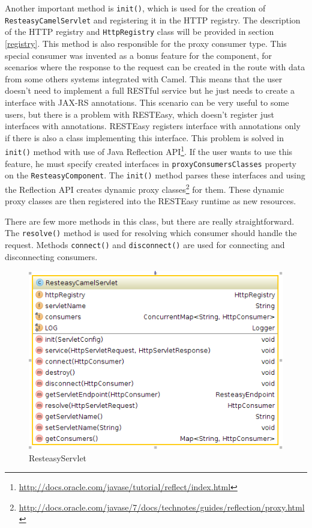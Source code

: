 \documentclass[12pt,final,oneside]{fithesis2}
\begin{document}
Another important method is \texttt{init()}, which is used for the creation of \texttt{ResteasyCamelServlet} and registering it in the HTTP registry. The description of the HTTP registry and \texttt{HttpRegistry} class will be provided in section \ref{registry}. This method is also responsible for the proxy consumer type. This special consumer was invented as a bonus feature for the component, for scenarios where the response to the request can be created in the route with data from some others systems integrated with Camel. This means that the user doesn't need to implement a full RESTful service but he just needs to create a interface with JAX-RS annotations. This scenario can be very useful to some users, but there is a problem with RESTEasy, which  doesn't register just interfaces with annotations. RESTEasy registers interface with annotations only if there is also a class implementing this interface. This problem is solved in \texttt{init()} method with use of Java Reflection API\footnote{\url{http://docs.oracle.com/javase/tutorial/reflect/index.html}}. If the user wants to use this feature, he must specify created interfaces in \texttt{proxyConsumersClasses} property on the \texttt{ResteasyComponent}. The \texttt{init()} method parses these interfaces and using the Reflection API creates dynamic proxy classes\footnote{\url{http://docs.oracle.com/javase/7/docs/technotes/guides/reflection/proxy.html}} for them. These dynamic proxy classes are then registered into the RESTEasy runtime as new resources.

There are few more methods in this class, but there are really straightforward. The \texttt{resolve()} method is used for resolving which consumer should handle the request. Methods \texttt{connect()} and \texttt{disconnect()} are used for connecting and disconnecting consumers. 

\begin{figure}
\centering
\includegraphics[width=0.8\linewidth]{images/servlet.png}
\caption{ResteasyServlet}
\label{comp}
\end{figure}
\end{document}

